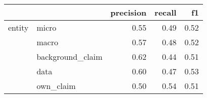 \begin{tabular}{llrrr}
\toprule
       &           &  precision &  recall &   f1 \\
\midrule
entity & micro &       0.55 &    0.49 & 0.52 \\
       & macro &       0.57 &    0.48 & 0.52 \\
       & background\_claim &       0.62 &    0.44 & 0.51 \\
       & data &       0.60 &    0.47 & 0.53 \\
       & own\_claim &       0.50 &    0.54 & 0.51 \\
\bottomrule
\end{tabular}
